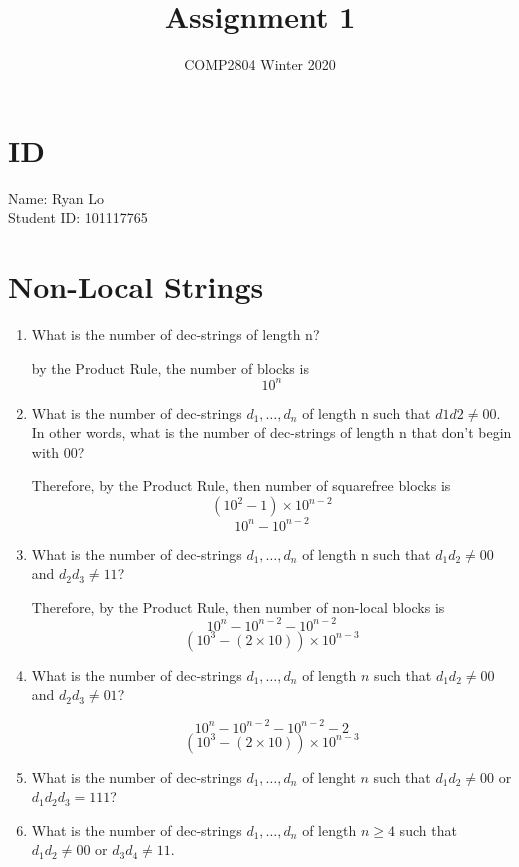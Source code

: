 \documentclass{article}
\title{Assignment 1}
\author{COMP2804 Winter 2020}
\begin{document}
\maketitle

\section{ID}

Name: Ryan Lo \\
Student ID: 101117765

\section{Non-Local Strings}

\begin{enumerate}
   \item What is the number of dec-strings of length n?
  
   by the Product Rule, the number of blocks is
   \[
      10^{n}
   \]

   \item What is the number of dec-strings $d_1,\ldots,d_n$ of length n such that $d1d2\neq00$. In other words, what is the number of dec-strings of length n that don't begin with 00?
 
   Therefore, by the Product Rule, then number of squarefree blocks is 
   \[
      (10^{2}-1) \times 10^{n-2}
   \]
   \[
      10^{n} - 10^{n-2}
   \]
  
   \item What is the number of dec-strings $d_1,\ldots,d_n$ of length n such that $d_1d_2\neq00$ and $d_2d_3\neq11$?
  
   Therefore, by the Product Rule, then number of non-local blocks is 
   \[
      10^{n} - 10^{n-2} - 10^{n-2}
   \]
   \[
      (10^3 - (2 \times 10)) \times 10^{n-3}
   \]  
   \item What is the number of dec-strings $d_1,\ldots,d_n$ of length $n$ such that $d_1d_2\neq00$ and $d_2d_3\neq01$?
   
   \[
      10^{n} - 10^{n-2} - 10^{n-2} - 2
   \]
   \[
      (10^3 - (2 \times 10)) \times 10^{n-3}
   \] 

   \item What is the number of dec-strings $d_1,\ldots,d_n$ of lenght $n$ such that $d_1d_2\neq00$ or $d_1d_2d_3=111$?
   
   \item What is the number of dec-strings $d_1,\ldots,d_n$ of length $n\geq4$ such that $d_1d_2\neq00$ or $d_3d_4\neq11$.
   

\end{enumerate}
\end{document}
